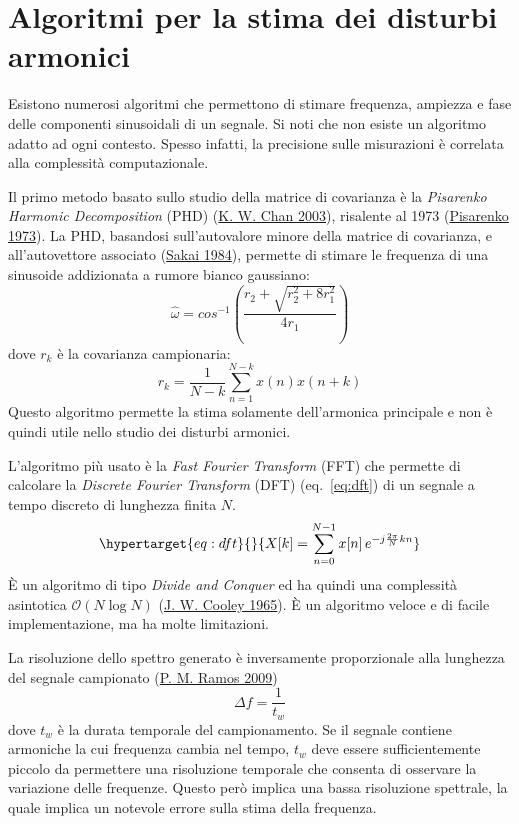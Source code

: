 \documentclass[
  italian,
]{article}
\begin{document}
\hypertarget{algoritmi-per-la-stima-dei-disturbi-armonici}{%
\section{Algoritmi per la stima dei disturbi
armonici}\label{algoritmi-per-la-stima-dei-disturbi-armonici}}

Esistono numerosi algoritmi che permettono di stimare frequenza,
ampiezza e fase delle componenti sinusoidali di un segnale. Si noti che
non esiste un algoritmo adatto ad ogni contesto. Spesso infatti, la
precisione sulle misurazioni è correlata alla complessità
computazionale.

Il primo metodo basato sullo studio della matrice di covarianza è la
\emph{Pisarenko Harmonic Decomposition} (PHD)
(\protect\hyperlink{ref-pisarenko-single-tone}{K. W. Chan 2003}),
risalente al 1973 (\protect\hyperlink{ref-pisarenko-original}{Pisarenko
1973}). La PHD, basandosi sull'autovalore minore della matrice di
covarianza, e all'autovettore associato
(\protect\hyperlink{ref-pisarenko-stat-analysis}{Sakai 1984}), permette
di stimare le frequenza di una sinusoide addizionata a rumore bianco
gaussiano: \[
\hat{\omega} = cos^{-1} \left(
    \frac{r_2 + \sqrt{r_2^2 + 8 r_1^2}}{4 r_1}
\right)
\] dove \(r_k\) è la covarianza campionaria: \[
r_k = \frac{1}{N - k} \sum_{n=1}^{N-k} x(n) x(n + k)
\] Questo algoritmo permette la stima solamente dell'armonica principale
e non è quindi utile nello studio dei disturbi armonici.

L'algoritmo più usato è la \emph{Fast Fourier Transform} (FFT) che
permette di calcolare la \emph{Discrete Fourier Transform} (DFT)
(eq.~\ref{eq:dft}) di un segnale a tempo discreto di lunghezza finita
\(N\). \begin{equation}\protect\hypertarget{eq:dft}{}{
X[k] = \sum_{n=0}^{N-1} x[n] \, e^{-j \frac{2\pi}{N}kn}
}\label{eq:dft}\end{equation} È un algoritmo di tipo \emph{Divide and
Conquer} ed ha quindi una complessità asintotica
\(\mathcal{O}(N\log{}N)\)
(\protect\hyperlink{ref-fourier-alg-machine}{J. W. Cooley 1965}). È un
algoritmo veloce e di facile implementazione, ma ha molte limitazioni.

La risoluzione dello spettro generato è inversamente proporzionale alla
lunghezza del segnale campionato
(\protect\hyperlink{ref-alg-comp-quality}{P. M. Ramos 2009}) \[
\Delta f = \frac{1}{t_w}
\] dove \(t_w\) è la durata temporale del campionamento. Se il segnale
contiene armoniche la cui frequenza cambia nel tempo, \(t_w\) deve
essere sufficientemente piccolo da permettere una risoluzione temporale
che consenta di osservare la variazione delle frequenze. Questo però
implica una bassa risoluzione spettrale, la quale implica un notevole
errore sulla stima della frequenza.
\end{document}
